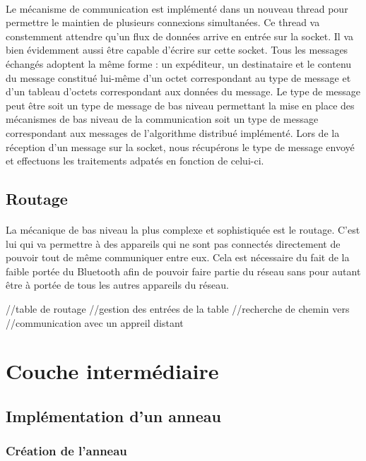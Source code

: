 \documentclass[a4paper,10pt]{report}
\begin{document}
    \paragraph{}
    Le mécanisme de communication est implémenté dans un nouveau thread pour permettre le maintien de plusieurs connexions simultanées. Ce thread va constemment attendre qu'un flux de données arrive en entrée sur la socket. Il va bien évidemment aussi être capable d'écrire sur cette socket.
    Tous les messages échangés adoptent la même forme : un expéditeur, un destinataire et le contenu du message constitué lui-même d'un octet correspondant au type de message et d'un tableau d'octets correspondant aux données du message. Le type de message peut être soit un type de message de bas niveau permettant la mise en place des mécanismes de bas niveau de la communication soit un type de message correspondant aux messages de l'algorithme distribué implémenté.
    Lors de la réception d'un message sur la socket, nous récupérons le type de message envoyé et effectuons les traitements adpatés en fonction de celui-ci.
    
    \subsection{Routage}
    \paragraph{}
    La mécanique de bas niveau la plus complexe et sophistiquée est le routage. C'est lui qui va permettre à des appareils qui ne sont pas connectés directement de pouvoir tout de même communiquer entre eux. Cela est nécessaire du fait de la faible portée du Bluetooth afin de pouvoir faire partie du réseau sans pour autant être à portée de tous les autres appareils du réseau.
    
    //table de routage
    //gestion des entrées de la table
    //recherche de chemin vers
    //communication avec un appreil distant
  
  \section{Couche intermédiaire}
    \subsection{Implémentation d'un anneau}
      \subsubsection{Création de l'anneau}
\end{document}
